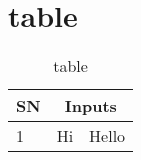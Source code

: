 \section{table}
\begin{table}[h]
	\centering
	\caption{table}
	\label{tab:Table}
	\begin{tabular}{l|c|r}\hline
		SN&\multicolumn{2}{c}{Inputs} \\ \hline
		1& Hi & Hello \\ \hline
	\end{tabular}
\end{table}